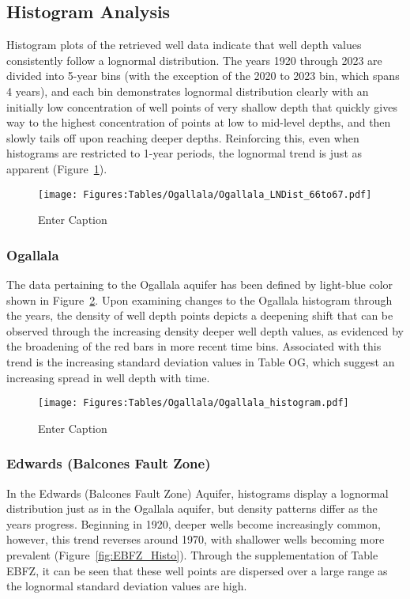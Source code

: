 
\subsection*{Histogram Analysis}
Histogram plots of the retrieved well data indicate that well depth values consistently follow a lognormal distribution. The years 1920 through 2023 are divided into 5-year bins (with the exception of the 2020 to 2023 bin, which spans 4 years), and each bin demonstrates lognormal distribution clearly with an initially low concentration of well points of very shallow depth that quickly gives way to the highest concentration of points at low to mid-level depths, and then slowly tails off upon reaching deeper depths. Reinforcing this, even when histograms are restricted to 1-year periods, the lognormal trend is just as apparent (Figure~\ref{fig:OG_1yr_LN}). 
\begin{figure}[h]
    \centering
    \texttt{[image: Figures:Tables/Ogallala/Ogallala\_LNDist\_66to67.pdf]}
    \caption{Enter Caption}
    \label{fig:OG_1yr_LN}
\end{figure}

\subsubsection*{Ogallala}
The data pertaining to the Ogallala aquifer has been defined by light-blue color shown in Figure~\ref{fig:OG_Histo}. Upon examining changes to the Ogallala histogram through the years, the density of well depth points depicts a deepening shift that can be observed through the increasing density deeper well depth values, as evidenced by the broadening of the red bars in more recent time bins. Associated with this trend is the increasing standard deviation values in Table OG, which suggest an increasing spread in well depth with time.

\begin{figure}[H]
    \centering
    \texttt{[image: Figures:Tables/Ogallala/Ogallala\_histogram.pdf]}
    \caption{Enter Caption}
    \label{fig:OG_Histo}
\end{figure}

\subsubsection*{Edwards (Balcones Fault Zone)}
In the Edwards (Balcones Fault Zone) Aquifer, histograms display a lognormal distribution just as in the Ogallala aquifer, but density patterns differ as the years progress. Beginning in 1920, deeper wells become increasingly common, however, this trend reverses around 1970, with shallower wells becoming more prevalent (Figure~\ref{fig:EBFZ_Histo}). Through the supplementation of Table EBFZ, it can be seen that these well points are dispersed over a large range as the lognormal standard deviation values are high.


